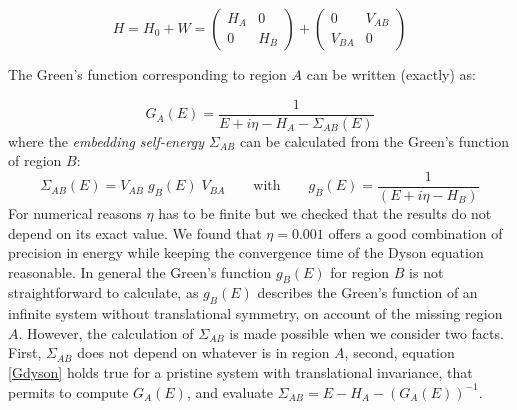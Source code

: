 \begin{equation}
  H = H_{0} + W = \left(\begin{array}{cc}
   H_{A} &  0  \\
    0     & H_{B}
  \end{array}\right)+
  \left(\begin{array}{cc}
    0 & V_{AB} \\
   V_{BA} & 0
  \end{array}\right)
\end{equation}

The Green's function corresponding to region $A$ can be written (exactly) as:

\begin{equation}
  G_{A}(E) %
  = \frac{1}{E +i\eta - H_{A}-\Sigma_{AB}(E)}
  \label{Gdyson}
\end{equation}
where the \emph{embedding self-energy} $\Sigma_{AB}$ can be calculated from the Green's function of region $B$: %
\begin{equation}
   \Sigma_{AB}(E) = V_{AB}\;g_B(E)\;V_{BA}
   \qquad\text{with}\qquad
   g_B(E) = \frac{1}{(E+i\eta-H_B)}
\end{equation}
For numerical reasons $\eta$ has to be finite but we checked that the results do not depend on its exact value. We found that $\eta=0.001$ offers a good combination of precision in energy while keeping the convergence time of the Dyson equation reasonable.
In general the Green's function $g_B(E)$ for region $B$
is not straightforward to calculate, as $g_B(E)$ describes the Green's function of an infinite system without translational symmetry, on account of the missing region $A$.
However, the calculation of $\Sigma_{AB}$ is made possible when we consider two facts. First, $\Sigma_{AB}$ does not depend on whatever is in region $A$, second, equation \eqref{Gdyson} holds true for a pristine system with translational invariance, that permits to compute $G_A(E)$, and evaluate $\Sigma_{AB}=E- H_A-(G_A(E))^{-1}$.


